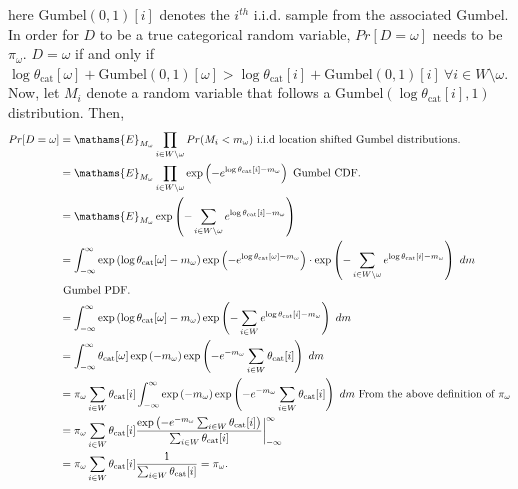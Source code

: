 \documentclass[
  11pt,
  letterpaper,
]{article}
\begin{document}
here \(\text{Gumbel}(0, 1)[i]\) denotes the \(i^{th}\) i.i.d. sample
from the associated Gumbel. In order for \(D\) to be a true categorical
random variable, \(Pr[D = \omega]\) needs to be \(\pi_\omega\).
\(D = \omega\) if and only if
\(\log \theta_\text{cat}[\omega] + \text{Gumbel}(0,1)[\omega] > \log \theta_\text{cat}[i] + \text{Gumbel}(0, 1)[i] \ \forall i \in W \setminus \omega\).
Now, let \(M_i\) denote a random variable that follows a
\(\text{Gumbel}(\log \theta_\text{cat}[i], 1)\) distribution. Then,
\begin{align*}
    Pr[D = \omega] 
        &= \mathams{E}_{M_\omega} 
            \prod_{i \in W \setminus \omega} Pr(M_i < m_\omega) 
            \text{ i.i.d location shifted Gumbel distributions.} \\ 
        &= \mathams{E}_{M_\omega} 
            \prod_{i \in W \setminus \omega} \exp 
                \left(-e^{\log \theta_\text{cat}[i] - m_\omega} \right)
            \text{ Gumbel CDF.} \\ 
        &= \mathams{E}_{M_\omega} 
            \exp \left(-\sum_{i \in W \setminus \omega}
            e^{\log \theta_\text{cat}[i] - m_\omega} \right) \\ 
        &= \int_{-\infty}^{\infty}
            \exp \left( \log \theta_\text{cat}[\omega] - m_\omega \right) 
            \exp \left(-e^{\log \theta_\text{cat}[\omega] - m_\omega} \right) \cdot 
            \exp \left (-\sum_{i \in W \setminus \omega}
            e^{\log \theta_\text{cat}[i] - m_\omega} \right) \ dm \\
            &\text{ Gumbel PDF.} \\
        &= \int_{-\infty}^{\infty}
            \exp \left( \log \theta_\text{cat}[\omega] - m_\omega \right) 
            \exp \left (-\sum_{i \in W}
            e^{\log \theta_\text{cat}[i] - m_\omega} \right) \ dm \\
        &= \int_{-\infty}^{\infty}
            \theta_\text{cat}[\omega] 
            \exp \left( -m_\omega \right) 
            \exp \left( -e^{-m_\omega} \sum_{i \in W}
                \theta_\text{cat}[i]  \right) \ dm \\
        &= \pi_\omega \sum_{i \in W} \theta_\text{cat}[i]
        \int_{-\infty}^{\infty}
            \exp \left( -m_\omega \right) 
            \exp \left( -e^{-m_\omega} \sum_{i \in W}
                \theta_\text{cat}[i]  \right) \ dm 
                \text{ From the above definition of } \pi_\omega \\
        &= \pi_\omega \sum_{i \in W} \theta_\text{cat}[i]
            \dfrac{\exp\left( -e^{-m_\omega} \sum_{i \in W} \theta_\text{cat}[i] \right)
                }{\sum_{i \in W} \theta_\text{cat}[i]} \bigg|_{-\infty}^\infty \\ 
        &= \pi_\omega \sum_{i \in W} \theta_\text{cat}[i]
            \dfrac{1}{\sum_{i \in W} \theta_\text{cat}[i]} = \pi_\omega. 
\end{align*}
\end{document}
